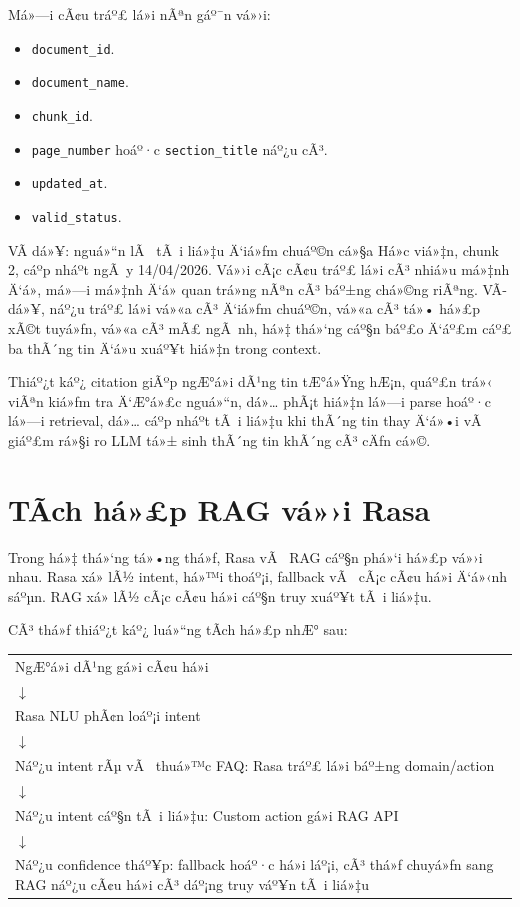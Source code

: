 ﻿\documentclass[12pt,a4paper]{report}
\begin{document}
Má»—i cÃ¢u tráº£ lá»i nÃªn gáº¯n vá»›i:

\begin{itemize}
    \item \texttt{document\_id}.
    \item \texttt{document\_name}.
    \item \texttt{chunk\_id}.
    \item \texttt{page\_number} hoáº·c \texttt{section\_title} náº¿u cÃ³.
    \item \texttt{updated\_at}.
    \item \texttt{valid\_status}.
\end{itemize}

VÃ­ dá»¥: nguá»“n lÃ  tÃ i liá»‡u Ä‘iá»ƒm chuáº©n cá»§a Há»c viá»‡n, chunk 2, cáº­p nháº­t ngÃ y 14/04/2026. Vá»›i cÃ¡c cÃ¢u tráº£ lá»i cÃ³ nhiá»u má»‡nh Ä‘á», má»—i má»‡nh Ä‘á» quan trá»ng nÃªn cÃ³ báº±ng chá»©ng riÃªng. VÃ­ dá»¥, náº¿u tráº£ lá»i vá»«a cÃ³ Ä‘iá»ƒm chuáº©n, vá»«a cÃ³ tá»• há»£p xÃ©t tuyá»ƒn, vá»«a cÃ³ mÃ£ ngÃ nh, há»‡ thá»‘ng cáº§n báº£o Ä‘áº£m cáº£ ba thÃ´ng tin Ä‘á»u xuáº¥t hiá»‡n trong context.

Thiáº¿t káº¿ citation giÃºp ngÆ°á»i dÃ¹ng tin tÆ°á»Ÿng hÆ¡n, quáº£n trá»‹ viÃªn kiá»ƒm tra Ä‘Æ°á»£c nguá»“n, dá»… phÃ¡t hiá»‡n lá»—i parse hoáº·c lá»—i retrieval, dá»… cáº­p nháº­t tÃ i liá»‡u khi thÃ´ng tin thay Ä‘á»•i vÃ  giáº£m rá»§i ro LLM tá»± sinh thÃ´ng tin khÃ´ng cÃ³ cÄƒn cá»©.

\section{TÃ­ch há»£p RAG vá»›i Rasa}

Trong há»‡ thá»‘ng tá»•ng thá»ƒ, Rasa vÃ  RAG cáº§n phá»‘i há»£p vá»›i nhau. Rasa xá»­ lÃ½ intent, há»™i thoáº¡i, fallback vÃ  cÃ¡c cÃ¢u há»i Ä‘á»‹nh sáºµn. RAG xá»­ lÃ½ cÃ¡c cÃ¢u há»i cáº§n truy xuáº¥t tÃ i liá»‡u.

CÃ³ thá»ƒ thiáº¿t káº¿ luá»“ng tÃ­ch há»£p nhÆ° sau:

\begin{center}
\begin{tabular}{p{12cm}}
NgÆ°á»i dÃ¹ng gá»­i cÃ¢u há»i \\
$\downarrow$ \\
Rasa NLU phÃ¢n loáº¡i intent \\
$\downarrow$ \\
Náº¿u intent rÃµ vÃ  thuá»™c FAQ: Rasa tráº£ lá»i báº±ng domain/action \\
$\downarrow$ \\
Náº¿u intent cáº§n tÃ i liá»‡u: Custom action gá»i RAG API \\
$\downarrow$ \\
Náº¿u confidence tháº¥p: fallback hoáº·c há»i láº¡i, cÃ³ thá»ƒ chuyá»ƒn sang RAG náº¿u cÃ¢u há»i cÃ³ dáº¡ng truy váº¥n tÃ i liá»‡u
\end{tabular}
\end{center}
\end{document}
